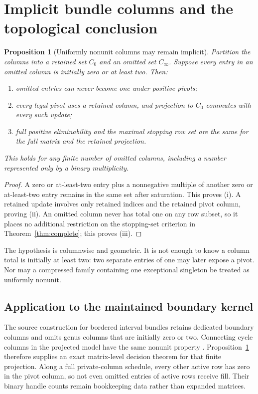 \documentclass[11pt]{article}
\newtheorem{proposition}[theorem]{Proposition}
\theoremstyle{definition}\newtheorem{definition}[theorem]{Definition}
\theoremstyle{remark}\newtheorem{remark}[theorem]{Remark}
\begin{document}
\section{Implicit bundle columns and the topological conclusion}
\label{sec:geometry}

\begin{proposition}[Uniformly nonunit columns may remain implicit]
\label{prop:implicit}
Partition the columns into a retained set $C_0$ and an omitted set $C_\infty$. Suppose every entry in an omitted column is initially zero or at least two. Then:
\begin{enumerate}[label=(\roman*)]
\item omitted entries can never become one under positive pivots;
\item every legal pivot uses a retained column, and projection to $C_0$ commutes with every such update;
\item full positive eliminability and the maximal stopping row set are the same for the full matrix and the retained projection.
\end{enumerate}
This holds for any finite number of omitted columns, including a number represented only by a binary multiplicity.
\end{proposition}
\begin{proof}
A zero or at-least-two entry plus a nonnegative multiple of another zero or at-least-two entry remains in the same set after saturation. This proves (i). A retained update involves only retained indices and the retained pivot column, proving (ii). An omitted column never has total one on any row subset, so it places no additional restriction on the stopping-set criterion in Theorem~\ref{thm:complete}; this proves (iii).
\end{proof}

The hypothesis is columnwise and geometric. It is not enough to know a column total is initially at least two: two separate entries of one may later expose a pivot. Nor may a compressed family containing one exceptional singleton be treated as uniformly nonunit.

\subsection{Application to the maintained boundary kernel}
The source construction for bordered interval bundles retains dedicated boundary columns and omits genus columns that are initially zero or two. Connecting cycle columns in the projected model have the same nonunit property \cite{repo-kernel}. Proposition~\ref{prop:implicit} therefore supplies an exact matrix-level decision theorem for that finite projection. Along a full private-column schedule, every other active row has zero in the pivot column, so not even omitted entries of active rows receive fill. Their binary handle counts remain bookkeeping data rather than expanded matrices.
\end{document}
